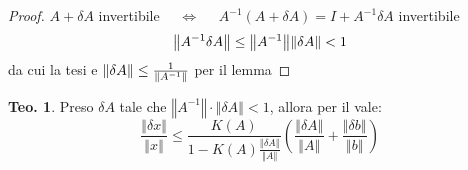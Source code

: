 \documentclass[a4paper,10pt]{article}
\theoremstyle{definition}
\theoremstyle{indentdefinition}
\theoremstyle{indenttheorem}
\newtheorem{thm}{Teo.}
\theoremstyle{myremark}
\theoremstyle{indentgeneral}
\theoremstyle{plain}
\theoremstyle{plain}
\begin{document}
\begin{proof}
$A+\delta A$ invertibile $\quad\Longleftrightarrow\quad$ $A^{-1}\left(A+\delta A\right)=I+A^{-1}\delta A$
invertibile
 $$\norm{A^{-1}\delta A}\le \norm{A^{-1}}\norm{\delta A}<1$$
 da cui la tesi e $\norm{\delta A}\le \frac{1}{\norm{A^{-1}}}$ per il lemma
\end{proof}

\begin{thm}
Preso $\delta A$ tale che $\left\Vert A^{-1}\right\Vert \cdot\left\Vert \delta A\right\Vert <1$,
allora per il  vale: 
\[
\frac{\left\Vert \delta x\right\Vert }{\left\Vert x\right\Vert }\leq\frac{K\left(A\right)}{1-K\left(A\right)\frac{\left\Vert \delta A\right\Vert }{\left\Vert A\right\Vert }}\left(\frac{\left\Vert \delta A\right\Vert }{\left\Vert A\right\Vert }+\frac{\left\Vert \delta b\right\Vert }{\left\Vert b\right\Vert }\right)
\]
\end{thm}
\end{document}
